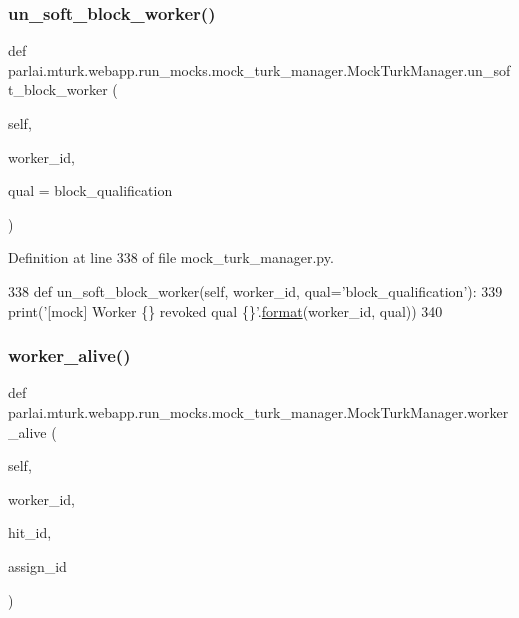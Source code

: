 \subsubsection{\texorpdfstring{un\+\_\+soft\+\_\+block\+\_\+worker()}{un\_soft\_block\_worker()}}
{\footnotesize\ttfamily def parlai.\+mturk.\+webapp.\+run\+\_\+mocks.\+mock\+\_\+turk\+\_\+manager.\+Mock\+Turk\+Manager.\+un\+\_\+soft\+\_\+block\+\_\+worker (\begin{DoxyParamCaption}\item[{}]{self,  }\item[{}]{worker\+\_\+id,  }\item[{}]{qual = {\ttfamily \textquotesingle{}block\+\_\+qualification\textquotesingle{}} }\end{DoxyParamCaption})}



Definition at line 338 of file mock\+\_\+turk\+\_\+manager.\+py.


\begin{DoxyCode}
338     \textcolor{keyword}{def }un\_soft\_block\_worker(self, worker\_id, qual='block\_qualification'):
339         print(\textcolor{stringliteral}{'[mock] Worker \{\} revoked qual \{\}'}.\hyperlink{namespaceparlai_1_1chat__service_1_1services_1_1messenger_1_1shared__utils_a32e2e2022b824fbaf80c747160b52a76}{format}(worker\_id, qual))
340 
\end{DoxyCode}
\mbox{\label{classparlai_1_1mturk_1_1webapp_1_1run__mocks_1_1mock__turk__manager_1_1MockTurkManager_a0de1a403e413421953de31fcb9033d8f}} 
\subsubsection{\texorpdfstring{worker\+\_\+alive()}{worker\_alive()}}
{\footnotesize\ttfamily def parlai.\+mturk.\+webapp.\+run\+\_\+mocks.\+mock\+\_\+turk\+\_\+manager.\+Mock\+Turk\+Manager.\+worker\+\_\+alive (\begin{DoxyParamCaption}\item[{}]{self,  }\item[{}]{worker\+\_\+id,  }\item[{}]{hit\+\_\+id,  }\item[{}]{assign\+\_\+id }\end{DoxyParamCaption})}

